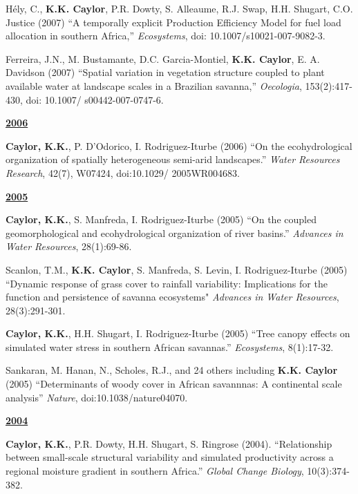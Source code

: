 \documentclass[10pt]{report}
\begin{document}
\begin{etaremune}
\item H\'ely, C., \textbf{K.K. Caylor}, P.R. Dowty, S. Alleaume, R.J. Swap, H.H. Shugart, C.O. Justice (2007) ``A temporally explicit Production Efficiency Model for fuel load allocation in southern Africa,'' \emph{Ecosystems}, doi: 10.1007/s10021-007-9082-3.

\item Ferreira, J.N., M. Bustamante, D.C. Garcia-Montiel, \textbf{K.K. Caylor}, E. A. Davidson (2007) ``Spatial variation in vegetation structure coupled to plant available water at landscape scales in a Brazilian savanna,'' \emph{Oecologia}, 153(2):417-430, doi: 10.1007/ s00442-007-0747-6.

\underline{\textbf{2006}}

\item \textbf{Caylor, K.K.}, P. D'Odorico, I. Rodriguez-Iturbe (2006) ``On the ecohydrological organization of spatially heterogeneous semi-arid landscapes.'' \emph{Water Resources Research}, 42(7), W07424, doi:10.1029/ 2005WR004683.

\underline{\textbf{2005}}
\item \textbf{Caylor, K.K.}, S. Manfreda, I. Rodriguez-Iturbe (2005) ``On the coupled geomorphological and ecohydrological organization of river basins.'' \emph{Advances in Water Resources}, 28(1):69-86.

\item Scanlon, T.M., \textbf{K.K. Caylor}, S. Manfreda, S. Levin, I. Rodriguez-Iturbe (2005) ``Dynamic response of grass cover to rainfall variability: Implications for the function and persistence of savanna ecosystems" \emph{Advances in Water Resources}, 28(3):291-301.

\item \textbf{Caylor, K.K.}, H.H. Shugart, I. Rodriguez-Iturbe (2005) ``Tree canopy effects on simulated water stress in southern African savannas.'' \emph{Ecosystems}, 8(1):17-32.

\item Sankaran, M. Hanan, N., Scholes, R.J., and 24 others including \textbf{K.K. Caylor} (2005) ``Determinants of woody cover in African savannnas: A continental scale analysis'' \emph{Nature}, doi:10.1038/nature04070.

\underline{\textbf{2004}}

\item \textbf{Caylor, K.K.}, P.R. Dowty, H.H. Shugart, S. Ringrose (2004). ``Relationship between small-scale structural variability and simulated productivity across a regional moisture gradient in southern Africa.'' \emph{Global Change Biology}, 10(3):374-382.


\end{etaremune}
\end{document}
